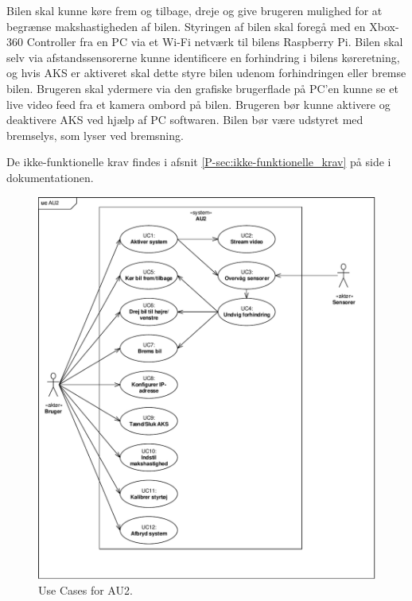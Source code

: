 Bilen skal kunne køre frem og tilbage, dreje og give brugeren mulighed for at begrænse makshastigheden af bilen. 
Styringen af bilen skal foregå med en Xbox-360 Controller fra en PC via et Wi-Fi netværk til bilens Raspberry Pi.
Bilen skal selv via afstandssensorerne kunne identificere en forhindring i bilens køreretning, og hvis AKS er aktiveret skal dette styre bilen udenom forhindringen eller bremse bilen.
Brugeren skal ydermere via den grafiske brugerflade på PC'en kunne se et live video feed fra et kamera ombord på bilen.
Brugeren bør kunne aktivere og deaktivere AKS ved hjælp af PC softwaren.
Bilen bør være udstyret med bremselys, som lyser ved bremsning.

De ikke-funktionelle krav findes i afsnit \ref{P-sec:ikke-funktionelle_krav}  på side \pageref{P-sec:ikke-funktionelle_krav} i dokumentationen.

\clearpage

\begin{figure}[h]
\centering
\includegraphics[width=\textwidth]{../fig/diagrammer/uc_au2}
\caption{Use Cases for AU2.}
\label{fig:use_cases}
\end{figure}